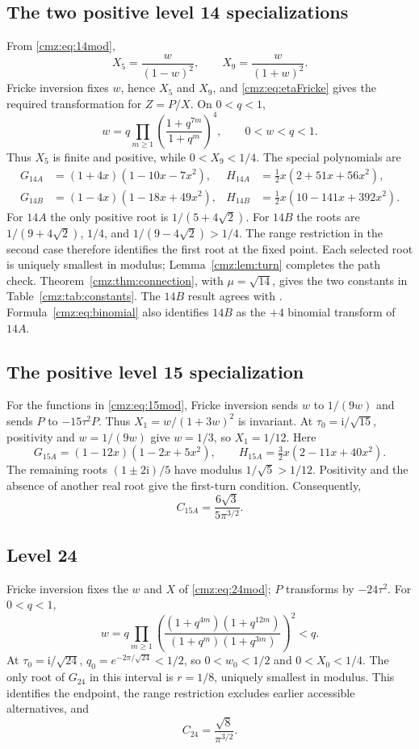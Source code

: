 \documentclass[11pt,letterpaper]{article}
\numberwithin{equation}{section}
\theoremstyle{definition}\newtheorem{definition}[theorem]{Definition}
\theoremstyle{remark}\newtheorem{remark}[theorem]{Remark}
\newcommand{\ii}{\mathrm i}
\begin{document}
\subsection{The two positive level 14 specializations}
From \eqref{cmz:eq:14mod},
\[
X_5=\frac{w}{(1-w)^2},\qquad X_9=\frac{w}{(1+w)^2}.
\]
Fricke inversion fixes $w$, hence $X_5$ and $X_9$, and \eqref{cmz:eq:etaFricke} gives the required transformation for $Z=P/X$. On $0<q<1$,
\begin{equation}
w=q\prod_{m\geq1}\left(\frac{1+q^{7m}}{1+q^m}\right)^4,
\qquad 0<w<q<1.
\label{cmz:eq:14bounds}
\end{equation}
Thus $X_5$ is finite and positive, while $0<X_9<1/4$. The special polynomials are
\begin{align*}
G_{14A}&=(1+4x)(1-10x-7x^2),&
H_{14A}&=\tfrac12x(2+51x+56x^2),\\
G_{14B}&=(1-4x)(1-18x+49x^2),&
H_{14B}&=\tfrac12x(10-141x+392x^2).
\end{align*}
For $14A$ the only positive root is $1/(5+4\sqrt2)$. For $14B$ the roots are $1/(9+4\sqrt2)$, $1/4$, and $1/(9-4\sqrt2)>1/4$. The range restriction in the second case therefore identifies the first root at the fixed point. Each selected root is uniquely smallest in modulus; Lemma~\ref{cmz:lem:turn} completes the path check. Theorem~\ref{cmz:thm:connection}, with $\mu=\sqrt{14}$, gives the two constants in Table~\ref{cmz:tab:constants}. The $14B$ result agrees with \cite[Example 6]{GZ}. Formula~\eqref{cmz:eq:binomial} also identifies $14B$ as the $+4$ binomial transform of $14A$.

\subsection{The positive level 15 specialization}
For the functions in \eqref{cmz:eq:15mod}, Fricke inversion sends $w$ to $1/(9w)$ and sends $P$ to $-15\tau^2P$. Thus $X_1=w/(1+3w)^2$ is invariant. At $\tau_0=\ii/\sqrt{15}$, positivity and $w=1/(9w)$ give $w=1/3$, so $X_1=1/12$. Here
\[
G_{15A}=(1-12x)(1-2x+5x^2),\qquad
H_{15A}=\tfrac32x(2-11x+40x^2).
\]
The remaining roots $(1\pm2\ii)/5$ have modulus $1/\sqrt5>1/12$. Positivity and the absence of another real root give the first-turn condition. Consequently,
\begin{equation}
C_{15A}=\frac{6\sqrt3}{5\pi^{3/2}}.
\label{cmz:eq:C15A}
\end{equation}

\subsection{Level 24}
Fricke inversion fixes the $w$ and $X$ of \eqref{cmz:eq:24mod}; $P$ transforms by $-24\tau^2$. For $0<q<1$,
\[
w=q\prod_{m\geq1}
\left(\frac{(1+q^{4m})(1+q^{12m})}{(1+q^m)(1+q^{3m})}\right)^2<q.
\]
At $\tau_0=\ii/\sqrt{24}$, $q_0=e^{-2\pi/\sqrt{24}}<1/2$, so $0<w_0<1/2$ and $0<X_0<1/4$. The only root of $G_{24}$ in this interval is $r=1/8$, uniquely smallest in modulus. This identifies the endpoint, the range restriction excludes earlier accessible alternatives, and
\begin{equation}
C_{24}=\frac{\sqrt8}{\pi^{3/2}}.
\label{cmz:eq:C24}
\end{equation}
\end{document}
